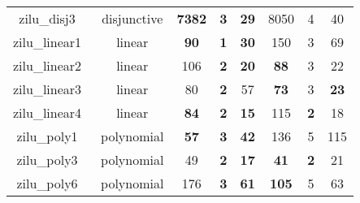 \begin{table}[t]
\begin{tabular}{l c | c c c | c c c |}
\multicolumn{1}{|c|}{zilu\_disj3~\cite{zilu:repo}}				&disjunctive	&\xmark \textbf{7382} & \textbf{3} &\textbf{29}	     &8050 & 4  & 40 		  				\\
\multicolumn{1}{|c|}{zilu\_linear1~\cite{zilu:repo}}			&linear			&\textbf{90}	&\textbf{1}	&\textbf{30}	&150	&3	&69\\
\multicolumn{1}{|c|}{zilu\_linear2~\cite{zilu:repo}}			&linear			&106	&\textbf{2}	&\textbf{20}	&\textbf{88}	&3	&22\\
\multicolumn{1}{|c|}{zilu\_linear3~\cite{zilu:repo}}			&linear			&80	&\textbf{2}	&57	&\textbf{73}	&3	&\textbf{23}\\
\multicolumn{1}{|c|}{zilu\_linear4~\cite{zilu:repo}}			&linear 		&\textbf{84}	&\textbf{2}	&\textbf{15}       &115	&\textbf{2}	&18				\\
\multicolumn{1}{|c|}{zilu\_poly1~\cite{zilu:repo}}				&polynomial		&\textbf{57}	&\textbf{3}	&\textbf{42}	               &136	&5	&115				\\
\multicolumn{1}{|c|}{zilu\_poly3~\cite{zilu:repo}}				&polynomial		&49	&\textbf{2}	&\textbf{17}				               &\textbf{41} &\textbf{2}	&21	\\
\multicolumn{1}{|c|}{zilu\_poly6~\cite{zilu:repo}}				&polynomial		&176	&\textbf{3}	&\textbf{61}	&\textbf{105}	&5	&63 \\



\end{tabular}
\end{table}
